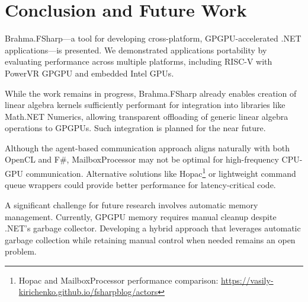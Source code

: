 \section{Conclusion and Future Work}

Brahma.FSharp---a tool for developing cross-platform, GPGPU-accelerated .NET applications---is presented.
We demonstrated applications portability by evaluating performance across multiple platforms, including RISC-V with PowerVR GPGPU and embedded Intel GPUs.

While the work remains in progress, Brahma.FSharp already enables creation of linear algebra kernels sufficiently performant for integration into libraries like Math.NET Numerics, allowing transparent offloading of generic linear algebra operations to GPGPUs.
Such integration is planned for the near future.


Although the agent-based communication approach aligns naturally with both OpenCL and F\#, MailboxProcessor may not be optimal for high-frequency CPU-GPU communication.
Alternative solutions like Hopac\footnote{Hopac and MailboxProcessor performance comparison: \url{https://vasily-kirichenko.github.io/fsharpblog/actors}} or lightweight command queue wrappers could provide better performance for latency-critical code.

A significant challenge for future research involves automatic memory management.
Currently, GPGPU memory requires manual cleanup despite .NET's garbage collector.
Developing a hybrid approach that leverages automatic garbage collection while retaining manual control when needed remains an open problem.
